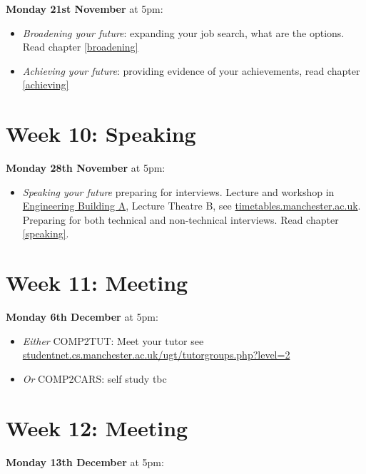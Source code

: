 \documentclass[
]{book}
\providecommand{\tightlist}{%
  \setlength{\itemsep}{0pt}\setlength{\parskip}{0pt}}
\begin{document}
\textbf{Monday 21st November} at 5pm:

\begin{itemize}
\tightlist
\item
  \emph{Broadening your future}: expanding your job search, what are the options. Read chapter \ref{broadening}
\item
  \emph{Achieving your future}: providing evidence of your achievements, read chapter \ref{achieving}
\end{itemize}

\hypertarget{week10}{%
\section{Week 10: Speaking}\label{week10}}

\textbf{Monday 28th November} at 5pm:

\begin{itemize}
\tightlist
\item
  \emph{Speaking your future} preparing for interviews. Lecture and workshop in \href{https://www.manchester.ac.uk/discover/maps/interactive-map/?id=540}{Engineering Building A}, Lecture Theatre B, see \href{https://timetables.manchester.ac.uk/}{timetables.manchester.ac.uk}. Preparing for both technical and non-technical interviews. Read chapter \ref{speaking}.
\end{itemize}

\hypertarget{week11}{%
\section{Week 11: Meeting}\label{week11}}

\textbf{Monday 6th December} at 5pm:

\begin{itemize}
\tightlist
\item
  \emph{Either} COMP2TUT: Meet your tutor see \href{http://studentnet.cs.manchester.ac.uk/ugt/tutorgroups.php?level=2}{studentnet.cs.manchester.ac.uk/ugt/tutorgroups.php?level=2}
\item
  \emph{Or} COMP2CARS: self study tbc
\end{itemize}

\hypertarget{week12}{%
\section{Week 12: Meeting}\label{week12}}

\textbf{Monday 13th December} at 5pm:
\end{document}
